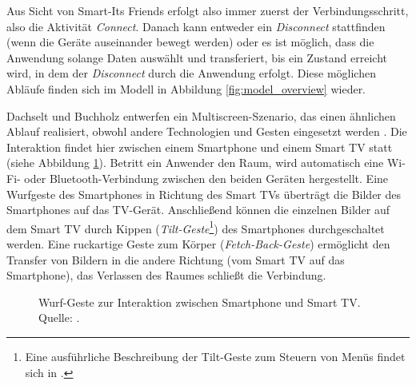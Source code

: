 Aus Sicht von Smart-Its Friends erfolgt also immer zuerst der Verbindungsschritt, also die Aktivität \textit{Connect}. Danach kann entweder ein \textit{Disconnect} stattfinden (wenn die Geräte auseinander bewegt werden) oder es ist möglich, dass die Anwendung solange Daten auswählt und transferiert, bis ein Zustand erreicht wird, in dem der \textit{Disconnect} durch die Anwendung erfolgt. Diese möglichen Abläufe finden sich im Modell in Abbildung \ref{fig:model_overview} wieder.

Dachselt und Buchholz entwerfen ein Multiscreen-Szenario, das einen ähnlichen Ablauf realisiert, obwohl andere Technologien und Gesten eingesetzt werden \citep{Dachselt2009}. Die Interaktion findet hier zwischen einem Smartphone und einem Smart TV statt (siehe Abbildung \ref{fig:throw_and_tilt}). Betritt ein Anwender den Raum, wird automatisch eine Wi-Fi- oder Bluetooth-Verbindung zwischen den beiden Geräten hergestellt. Eine Wurfgeste des Smartphones in Richtung des Smart TVs überträgt die Bilder des Smartphones auf das TV-Gerät. Anschließend können die einzelnen Bilder auf dem Smart TV durch Kippen (\textit{Tilt-Geste}\footnote{Eine ausführliche Beschreibung der Tilt-Geste zum Steuern von Menüs findet sich in \citep{Rekimoto1996}.}) des Smartphones durchgeschaltet werden. Eine ruckartige Geste zum Körper (\textit{Fetch-Back-Geste}) ermöglicht den Transfer von Bildern in die andere Richtung (vom Smart TV auf das Smartphone), das Verlassen des Raumes schließt die Verbindung.
\begin{figure}[h]
\centering
{}
\caption{Wurf-Geste zur Interaktion zwischen Smartphone und Smart TV. Quelle: \citep{Dachselt2009}.}
\label{fig:throw_and_tilt}
\end{figure}

